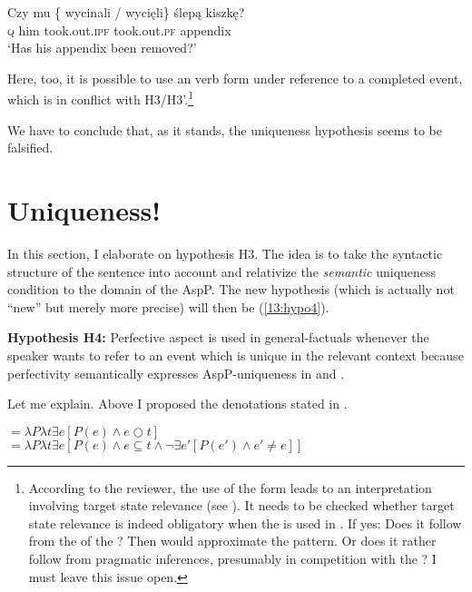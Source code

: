\documentclass[output=paper,modfonts,newtxmath,hidelinks]{langscibook}
\begin{document}
\begin{exe}
\ex\label{13:blinddarmpo}
\gll Czy mu  \{\hspace{-2pt} wycinali / wyci\k eli\}  {\'slep\k a kiszk\k e?} \\
\textsc{q} him {} took.out.\textsc{ipf} {} took.out.\textsc{pf} appendix \\
\glt `Has his appendix been removed?'
\end{exe}

\noindent Here, too, it is possible to use an  verb form under reference to a completed event, which is in conflict with H3/H3'.\footnote{According to the reviewer, the use of the  form leads to an interpretation involving target state relevance (see ). It needs to be checked whether target state relevance is indeed obligatory when the  is used in . If yes: Does it follow from the  of the ? Then  would approximate the  pattern. Or does it rather follow from pragmatic inferences, presumably in competition with the ? I must leave this issue open.}

We have to conclude that, as it stands, the uniqueness hypothesis seems to be falsified.  

\section{Uniqueness!}\label{13:s6} 

In this section, I elaborate on hypothesis H3. The idea is to take the syntactic structure of the sentence into account 
and relativize the \textit{semantic} uniqueness condition to the domain of the AspP. The new hypothesis (which is actually not ``new'' but merely more precise) will then be (\ref{13:hypo4}). 

\begin{exe}
\ex\label{13:hypo4}
\textbf{Hypothesis H4:} Perfective aspect is used in general-factuals whenever the speaker wants to refer to an event which is unique in the relevant context because perfectivity semantically expresses AspP-uniqueness in  and . 
\end{exe}

\noindent Let me explain. Above I proposed the denotations stated in .

\begin{exe}
\ex\label{13:semas}
${}= \lambda P \lambda t \exists e [ P(e) \wedge e \bigcirc t ]$\smallskip\\
${}= \lambda P \lambda t \exists e [ P(e) \wedge e \subseteq t \wedge \neg \exists e'[ P(e') \wedge e' \neq e ]]$
\end{exe}
\end{document}
